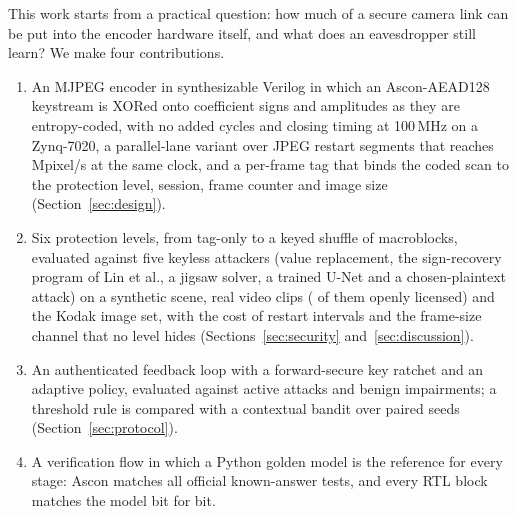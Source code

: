 \documentclass{ieeeaccess}
\begin{document}
This work starts from a practical question: how much of a secure camera link can be put into the encoder hardware itself, and what does an eavesdropper still learn? We make four contributions.
\begin{enumerate}
\item An MJPEG encoder in synthesizable Verilog in which an Ascon-AEAD128~\cite{sp800232,ascon} keystream is XORed onto coefficient signs and amplitudes as they are entropy-coded, with no added cycles and closing timing at 100\,MHz on a Zynq-7020, a parallel-lane variant over JPEG restart segments that reaches \RtlFourLanesMpix\,Mpixel/s at the same clock, and a per-frame tag that binds the coded scan to the protection level, session, frame counter and image size (Section~\ref{sec:design}).
\item Six protection levels, from tag-only to a keyed shuffle of macroblocks, evaluated against five keyless attackers (value replacement, the sign-recovery program of Lin et al., a jigsaw solver, a trained U-Net and a chosen-plaintext attack) on a synthetic scene, \NumVideoClips{} real video clips (\NumOpenClips{} of them openly licensed) and the Kodak image set, with the cost of restart intervals and the frame-size channel that no level hides (Sections~\ref{sec:security} and~\ref{sec:discussion}).
\item An authenticated feedback loop with a forward-secure key ratchet and an adaptive policy, evaluated against \NumAttacks{} active attacks and benign impairments; a threshold rule is compared with a contextual bandit over \Seeds{} paired seeds (Section~\ref{sec:protocol}).
\item A verification flow in which a Python golden model is the reference for every stage: Ascon matches all official known-answer tests, and every RTL block matches the model bit for bit.
\end{enumerate}
\end{document}
